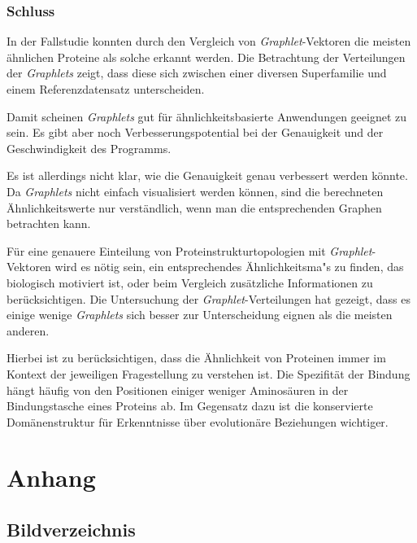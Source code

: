 \documentclass{report}
\begin{document}
\subsection{Schluss}

In der Fallstudie konnten durch den Vergleich von \textit{Graphlet}-Vektoren die meisten \"ahnlichen Proteine als solche erkannt werden. Die Betrachtung der Verteilungen der \textit{Graphlets} zeigt, dass diese sich zwischen einer diversen Superfamilie und einem Referenzdatensatz unterscheiden.

Damit scheinen \textit{Graphlets} gut f\"ur \"ahnlichkeitsbasierte Anwendungen geeignet zu sein. Es gibt aber noch Verbesserungspotential bei der Genauigkeit und der Geschwindigkeit des Programms.

Es ist allerdings nicht klar, wie die Genauigkeit genau verbessert werden k\"onnte. Da \textit{Graphlets} nicht einfach visualisiert werden k\"onnen, sind die berechneten \"Ahnlichkeitswerte nur verst\"andlich, wenn man die entsprechenden Graphen betrachten kann.

F\"ur eine genauere Einteilung von Proteinstrukturtopologien mit \textit{Graphlet}-Vektoren wird es n\"otig sein, ein entsprechendes \"Ahnlichkeitsma"s zu finden, das biologisch motiviert ist, oder beim Vergleich zus\"atzliche Informationen zu ber\"ucksichtigen. Die Untersuchung der \textit{Graphlet}-Verteilungen hat gezeigt, dass es einige wenige \textit{Graphlets} sich besser zur Unterscheidung eignen als die meisten anderen.

Hierbei ist zu ber\"ucksichtigen, dass die \"Ahnlichkeit von Proteinen immer im Kontext der jeweiligen Fragestellung zu verstehen ist. Die Spezifit\"at der Bindung h\"angt h\"aufig von den Positionen einiger weniger Aminos\"auren in der Bindungstasche eines Proteins ab. Im Gegensatz dazu ist die konservierte Dom\"anenstruktur f\"ur Erkenntnisse \"uber evolution\"are Beziehungen wichtiger.



\chapter{Anhang}


\section{Bildverzeichnis}
\end{document}
